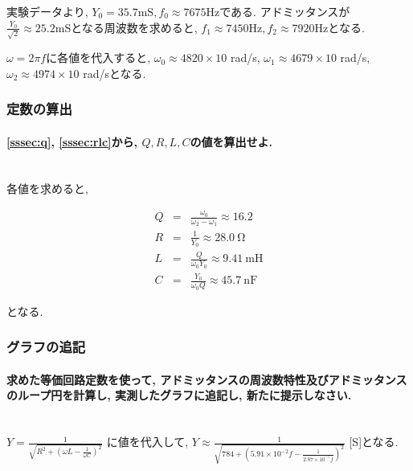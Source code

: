 \documentclass[titlepage]{jsarticle}
\begin{document}
                実験データより, $Y_0 = 35.7 \mathrm{mS}, f_0 \approx 7675 \mathrm{Hz}$である.
                アドミッタンスが$\displaystyle\frac{Y_0}{\sqrt{2}} \approx 25.2 \mathrm{mS}$となる周波数を求めると,
                $f_1 \approx 7450 \mathrm{Hz}, f_2 \approx 7920 \mathrm{Hz}$となる.

                $\omega = 2 \pi f$に各値を代入すると,
                $\omega_0 \approx 4820 \times 10$ rad/s,
                $\omega_1 \approx 4679 \times 10$ rad/s,
                $\omega_2 \approx 4974 \times 10$ rad/sとなる.

        \subsubsection{定数の算出}
            \paragraph{\ref{sssec:q}, \ref{sssec:rlc}から, $Q, R, L, C$の値を算出せよ.}
            \mbox{} \\

                各値を求めると,

                \begin{eqnarray*}
                    Q &=& \frac{\omega_0}{\omega_2 - \omega_1} \approx 16.2 \\
                    R &=& \frac{1}{Y_0} \approx 28.0 \ \mathrm{\Omega} \\
                    L &=& \frac{Q}{\omega_0 Y_0} \approx 9.41 \ \mathrm{mH} \\
                    C &=& \frac{Y_0}{\omega_0Q} \approx 45.7 \ \mathrm{nF}
                \end{eqnarray*}

                となる.

        \subsubsection{グラフの追記}
            \paragraph{求めた等価回路定数を使って, アドミッタンスの周波数特性及びアドミッタンスのループ円を計算し, 実測したグラフに追記し, 新たに提示しなさい.}
            \mbox{} \\

                $\displaystyle Y = \frac{1}{\sqrt{R^2 + \left(\omega L - \frac{1}{\omega C}\right)^2}}$
                に値を代入して, $\displaystyle Y \approx \frac{1}{\sqrt{784 + \left(5.91 \times 10^{-2} f - \frac{1}{2.87 \times 10^{-7} f}\right)^2}}$ [S]となる.
\end{document}
